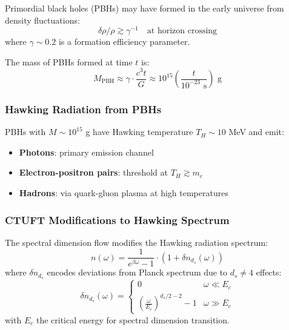 Primordial black holes (PBHs) may have formed in the early universe from density fluctuations:
\begin{equation}
    \delta \rho/\rho \gtrsim \gamma^{-1} \quad \text{at horizon crossing}
\end{equation}
where $\gamma \sim 0.2$ is a formation efficiency parameter.

The mass of PBHs formed at time $t$ is:
\begin{equation}
    M_{\text{PBH}} \approx \gamma \cdot \frac{c^3 t}{G} \approx 10^{15} \left(\frac{t}{10^{-23} \text{ s}}\right) \text{ g}
\end{equation}

\subsubsection{Hawking Radiation from PBHs}

PBHs with $M \sim 10^{15}$ g have Hawking temperature $T_H \sim 10$ MeV and emit:
\begin{itemize}
    \item \textbf{Photons}: primary emission channel
    \item \textbf{Electron-positron pairs}: threshold at $T_H \gtrsim m_e$
    \item \textbf{Hadrons}: via quark-gluon plasma at high temperatures
\end{itemize}

\subsubsection{CTUFT Modifications to Hawking Spectrum}

\begin{theorem}
The spectral dimension flow modifies the Hawking radiation spectrum:
\begin{equation}
    n(\omega) = \frac{1}{e^{\beta\omega} - 1} \cdot \left(1 + \delta n_{d_s}(\omega)\right)
\end{equation}
where $\delta n_{d_s}$ encodes deviations from Planck spectrum due to $d_s \neq 4$ effects:
\begin{equation}
    \delta n_{d_s}(\omega) = \begin{cases}
        0 & \omega \ll E_c \\
        \left(\frac{\omega}{E_c}\right)^{d_s/2 - 2} - 1 & \omega \gg E_c
    \end{cases}
\end{equation}
with $E_c$ the critical energy for spectral dimension transition.
\end{theorem}

